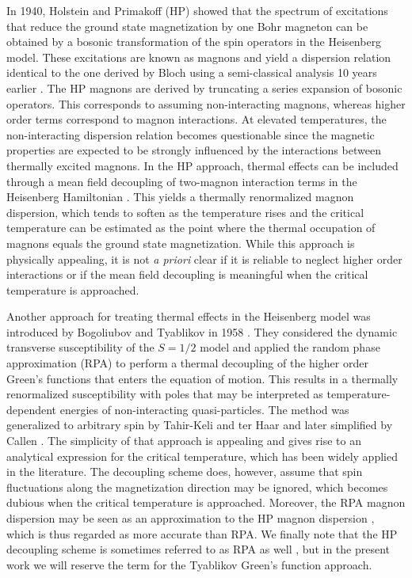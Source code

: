 \documentclass[aps,prb,reprint,floatfix,superscriptaddress]{revtex4-2}
\begin{document}
In 1940, Holstein and Primakoff (HP) \cite{holsteinprimakoff1940} showed that the spectrum of excitations that reduce the ground state magnetization by one Bohr magneton can be obtained by a bosonic transformation of the spin operators in the Heisenberg model. These excitations are known as magnons and yield a dispersion relation identical to the one derived by Bloch using a semi-classical analysis 10 years earlier \cite{Bloch1930}. The HP magnons are derived by truncating a series expansion of bosonic operators. This corresponds to assuming non-interacting magnons, whereas higher order terms correspond to magnon interactions. At elevated temperatures, the non-interacting dispersion relation becomes questionable since the magnetic properties are expected to be strongly influenced by the interactions between thermally excited magnons. In the HP approach, thermal effects can be included through a mean field decoupling of two-magnon interaction terms in the Heisenberg Hamiltonian \cite{Yosida1996}. This yields a thermally renormalized magnon dispersion, which tends to soften as the temperature rises and the critical temperature can be estimated as the point where the thermal occupation of magnons equals the ground state magnetization. While this approach is physically appealing, it is not \textit{a priori} clear if it is reliable to neglect higher order interactions or if the mean field decoupling is meaningful when the critical temperature is approached.

Another approach for treating thermal effects in the Heisenberg model was introduced by Bogoliubov and Tyablikov in 1958 \cite{tyablikov1959}. They considered the dynamic transverse susceptibility of the $S=1/2$ model and applied the random phase approximation (RPA) to perform a thermal decoupling of the higher order Green's functions that enters the equation of motion. This results in a thermally renormalized susceptibility with poles that may be interpreted as temperature-dependent energies of non-interacting quasi-particles. The method was generalized to arbitrary spin by Tahir-Keli and ter Haar \cite{tahir1962} and later simplified by Callen \cite{callen1963}. The simplicity of that approach is appealing and gives rise to an analytical expression for the critical temperature, which has been widely applied in the literature. The decoupling scheme does, however, assume that spin fluctuations along the magnetization direction may be ignored, which becomes dubious when the critical temperature is approached. Moreover, the RPA magnon dispersion may be seen as an approximation to the HP magnon dispersion \cite{Yosida1996}, which is thus regarded as more accurate \cite{Jensen1991} than RPA. We finally note that the HP decoupling scheme is sometimes referred to as RPA as well \cite{Yosida1996, Torelli_2019}, but in the present work we will reserve the term for the Tyablikov Green's function approach.
\end{document}
